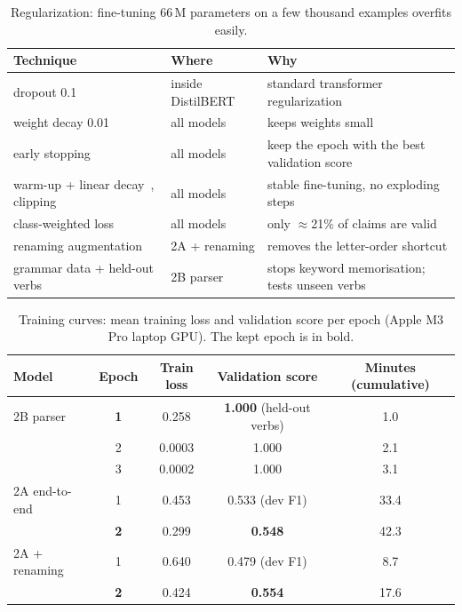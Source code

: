 \documentclass[12pt,a4paper]{article}
\newcommand{\thead}[1]{\textbf{#1}}
\begin{document}
\begin{table}[!htbp]
\centering\small
\caption{Regularization: fine-tuning 66\,M parameters on a few thousand examples overfits easily.}
\label{tab:reg}
\begin{tabularx}{\linewidth}{@{}>{\raggedright}p{4.5cm}>{\raggedright}p{2.6cm}X@{}}
\toprule
\thead{Technique} & \thead{Where} & \thead{Why} \\
\midrule
dropout 0.1~\cite{srivastava2014} & inside DistilBERT & standard transformer regularization \\
\rowcolor{rowtint} weight decay 0.01~\cite{loshchilov2019} & all models & keeps weights small \\
early stopping~\cite{prechelt1998} & all models & keep the epoch with the best validation score \\
\rowcolor{rowtint} warm-up + linear decay~\cite{howard2018}, clipping~\cite{pascanu2013} & all models & stable fine-tuning, no exploding steps \\
class-weighted loss~\cite{he2009} & all models & only $\approx$21\% of claims are valid \\
\rowcolor{rowtint} renaming augmentation~\cite{kaushik2020,wei2019} & 2A + renaming & removes the letter-order shortcut \\
grammar data + held-out verbs~\cite{wang2015,lake2018} & 2B parser & stops keyword memorisation; tests unseen verbs \\
\bottomrule
\end{tabularx}
\end{table}

\begin{table}[!htbp]
\centering\small
\caption{Training curves: mean training loss and validation score per epoch (Apple M3 Pro laptop GPU). The kept epoch is in bold.}
\label{tab:curves}
\begin{tabular}{@{}lcccc@{}}
\toprule
\thead{Model} & \thead{Epoch} & \thead{Train loss} & \thead{Validation score} & \thead{Minutes (cumulative)} \\
\midrule
2B parser & \textbf{1} & 0.258 & \textbf{1.000} (held-out verbs) & 1.0 \\
          & 2 & 0.0003 & 1.000 & 2.1 \\
          & 3 & 0.0002 & 1.000 & 3.1 \\
\rowcolor{rowtint} 2A end-to-end & 1 & 0.453 & 0.533 (dev F1) & 33.4 \\
\rowcolor{rowtint}               & \textbf{2} & 0.299 & \textbf{0.548} & 42.3 \\
2A + renaming & 1 & 0.640 & 0.479 (dev F1) & 8.7 \\
              & \textbf{2} & 0.424 & \textbf{0.554} & 17.6 \\
\bottomrule
\end{tabular}
\end{table}
\end{document}
